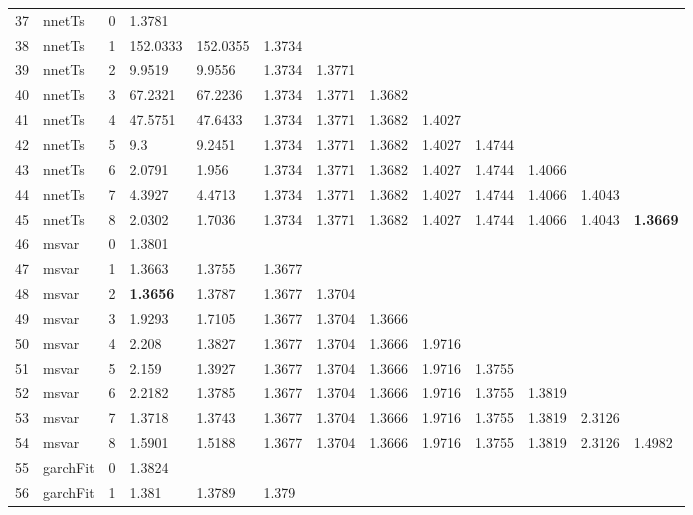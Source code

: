 \documentclass[10pt,a4paper]{article}
\begin{document}
\begin{table}[ht]
\begin{tabular}{rlrllllllllll}
   \hline
37 & nnetTs &     0 & 1.3781 &  &  &  &  &  &  &  &  &  \\ 
  38 & nnetTs &     1 & 152.0333 & 152.0355 & 1.3734 &  &  &  &  &  &  &  \\ 
  39 & nnetTs &     2 & 9.9519 & 9.9556 & 1.3734 & 1.3771 &  &  &  &  &  &  \\ 
  40 & nnetTs &     3 & 67.2321 & 67.2236 & 1.3734 & 1.3771 & 1.3682 &  &  &  &  &  \\ 
  41 & nnetTs &     4 & 47.5751 & 47.6433 & 1.3734 & 1.3771 & 1.3682 & 1.4027 &  &  &  &  \\ 
  42 & nnetTs &     5 & 9.3 & 9.2451 & 1.3734 & 1.3771 & 1.3682 & 1.4027 & 1.4744 &  &  &  \\ 
  43 & nnetTs &     6 & 2.0791 & 1.956 & 1.3734 & 1.3771 & 1.3682 & 1.4027 & 1.4744 & 1.4066 &  &  \\ 
  44 & nnetTs &     7 & 4.3927 & 4.4713 & 1.3734 & 1.3771 & 1.3682 & 1.4027 & 1.4744 & 1.4066 & 1.4043 &  \\ 
  45 & nnetTs &     8 & 2.0302 & 1.7036 & 1.3734 & 1.3771 & 1.3682 & 1.4027 & 1.4744 & 1.4066 & 1.4043 & \textbf{1.3669} \\ 
   \hline
46 & msvar &     0 & 1.3801 &  &  &  &  &  &  &  &  &  \\ 
  47 & msvar &     1 & 1.3663 & 1.3755 & 1.3677 &  &  &  &  &  &  &  \\ 
  48 & msvar &     2 & \textbf{1.3656} & 1.3787 & 1.3677 & 1.3704 &  &  &  &  &  &  \\ 
  49 & msvar &     3 & 1.9293 & 1.7105 & 1.3677 & 1.3704 & 1.3666 &  &  &  &  &  \\ 
  50 & msvar &     4 & 2.208 & 1.3827 & 1.3677 & 1.3704 & 1.3666 & 1.9716 &  &  &  &  \\ 
  51 & msvar &     5 & 2.159 & 1.3927 & 1.3677 & 1.3704 & 1.3666 & 1.9716 & 1.3755 &  &  &  \\ 
  52 & msvar &     6 & 2.2182 & 1.3785 & 1.3677 & 1.3704 & 1.3666 & 1.9716 & 1.3755 & 1.3819 &  &  \\ 
  53 & msvar &     7 & 1.3718 & 1.3743 & 1.3677 & 1.3704 & 1.3666 & 1.9716 & 1.3755 & 1.3819 & 2.3126 &  \\ 
  54 & msvar &     8 & 1.5901 & 1.5188 & 1.3677 & 1.3704 & 1.3666 & 1.9716 & 1.3755 & 1.3819 & 2.3126 & 1.4982 \\ 
   \hline
55 & garchFit &     0 & 1.3824 &  &  &  &  &  &  &  &  &  \\ 
  56 & garchFit &     1 & 1.381 & 1.3789 & 1.379 &  &  &  &  &  &  &  \\ 

\end{tabular}
\end{table}
\end{document}
